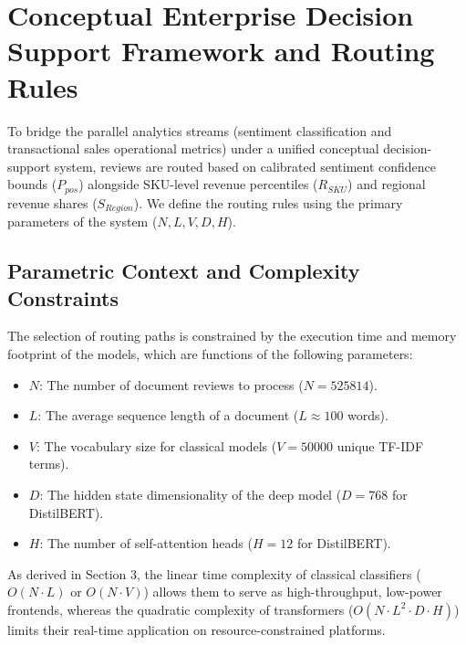 \documentclass[11pt]{article}
\begin{document}
\section{Conceptual Enterprise Decision Support Framework and Routing Rules}
To bridge the parallel analytics streams (sentiment classification and transactional sales operational metrics) under a unified conceptual decision-support system, reviews are routed based on calibrated sentiment confidence bounds ($P_{pos}$) alongside SKU-level revenue percentiles ($R_{SKU}$) and regional revenue shares ($S_{Region}$). We define the routing rules using the primary parameters of the system ($N, L, V, D, H$).

\subsection{Parametric Context and Complexity Constraints}
The selection of routing paths is constrained by the execution time and memory footprint of the models, which are functions of the following parameters:
\begin{itemize}
    \item $N$: The number of document reviews to process ($N = 525814$).
    \item $L$: The average sequence length of a document ($L \approx 100$ words).
    \item $V$: The vocabulary size for classical models ($V = 50000$ unique TF-IDF terms).
    \item $D$: The hidden state dimensionality of the deep model ($D = 768$ for DistilBERT).
    \item $H$: The number of self-attention heads ($H = 12$ for DistilBERT).
\end{itemize}
As derived in Section 3, the linear time complexity of classical classifiers ($O(N \cdot L)$ or $O(N \cdot V)$) allows them to serve as high-throughput, low-power frontends, whereas the quadratic complexity of transformers ($O(N \cdot L^2 \cdot D \cdot H)$) limits their real-time application on resource-constrained platforms.
\end{document}
